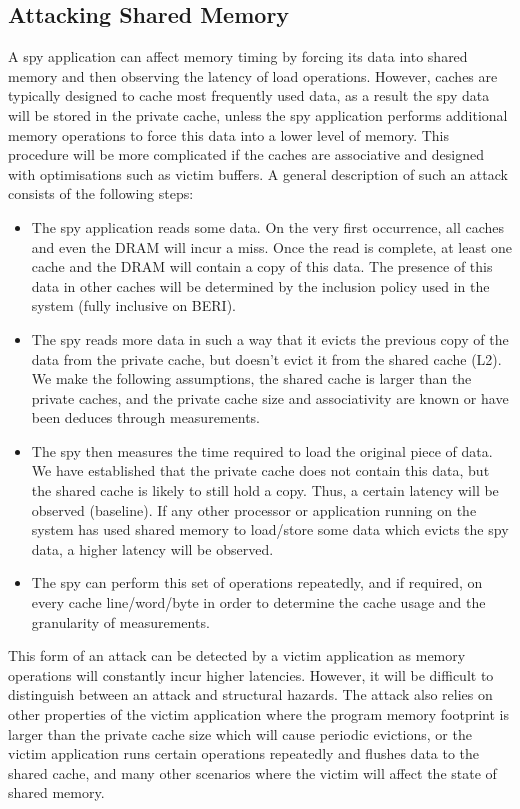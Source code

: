 	\subsection{Attacking Shared Memory}
		A spy application can affect memory timing by forcing its data into shared memory and then observing the latency of load operations. However, caches are typically designed to cache most frequently used data, as a result the spy data will be stored in the private cache, unless the spy application performs additional memory operations to force this data into a lower level of memory. This procedure will be more complicated if the caches are associative and designed with optimisations such as victim buffers. A general description of such an attack consists of the following steps:
		
		\begin{itemize}
			\item The spy application reads some data. On the very first occurrence, all caches and even the DRAM will incur a miss. Once the read is complete, at least one cache and the DRAM will contain a copy of this data. The presence of this data in other caches will be determined by the inclusion policy used in the system (fully inclusive on BERI).
			\item The spy reads more data in such a way that it evicts the previous copy of the data from the private cache, but doesn't evict it from the shared cache (L2). We make the following assumptions, the shared cache is larger than the private caches, and the private cache size and associativity are known or have been deduces through measurements.
			\item The spy then measures the time required to load the original piece of data. We have established that the private cache does not contain this data, but the shared cache is likely to still hold a copy. Thus, a certain latency will be observed (baseline). If any other processor or application running on the system has used shared memory to load/store some data which evicts the spy data, a higher latency will be observed.
			\item The spy can perform this set of operations repeatedly, and if required, on every cache line/word/byte in order to determine the cache usage and the granularity of measurements.
		\end{itemize}
	
		This form of an attack can be detected by a victim application as memory operations will constantly incur higher latencies. However, it will be difficult to distinguish between an attack and structural hazards.
		The attack also relies on other properties of the victim application where the program memory footprint is larger than the private cache size which will cause periodic evictions, or the victim application runs certain operations repeatedly and flushes data to the shared cache, and many other scenarios where the victim will affect the state of shared memory.
		
